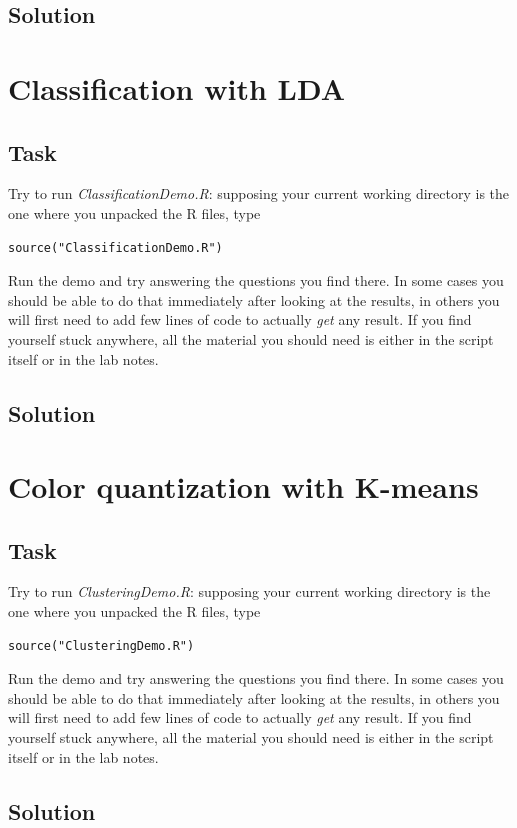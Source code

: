 \documentclass[a4paper,12pt,titlepage]{article} %
\begin{document}
\subsection{Solution}


\newpage
\section{Classification with LDA}
\subsection{Task}
Try to run \textit{ClassificationDemo.R}: supposing your current working directory is the one where you unpacked the R files, type
\begin{verbatim}
source("ClassificationDemo.R")
\end{verbatim}

Run the demo and try answering the questions you find there. In some cases you should be able to do that immediately after looking at the results, in others you will first need to add few lines of code to actually \textit{get} any result. If you find yourself stuck anywhere, all the material you should need is either in the script itself or in the lab notes.


\subsection{Solution}

\newpage
\section{Color quantization with K-means}
\subsection{Task}
Try to run \textit{ClusteringDemo.R}: supposing your current working directory is the one where you unpacked the R files, type
\begin{verbatim}
source("ClusteringDemo.R")
\end{verbatim}

Run the demo and try answering the questions you find there. In some cases you should be able to do that immediately after looking at the results, in others you will first need to add few lines of code to actually \textit{get} any result. If you find yourself stuck anywhere, all the material you should need is either in the script itself or in the lab notes.


\subsection{Solution}


\end{document}
